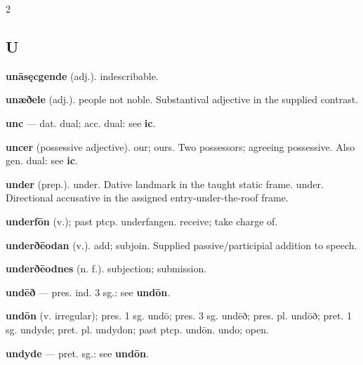 \begin{multicols*}{2}
\subsection*{U}
\textbf{unāsęcgende} (adj.). indescribable.\par
\textbf{unæðele} (adj.). people not noble. Substantival adjective in the supplied contrast.\par
\textbf{unc} — dat. dual; acc. dual: see \textbf{ic}.\par
\textbf{uncer} (possessive adjective). our; ours. Two possessors; agreeing possessive. Also gen. dual: see \textbf{ic}.\par
\textbf{under} (prep.). under. Dative landmark in the taught static frame. under. Directional accusative in the assigned entry-under-the-roof frame.\par
\textbf{underfōn} (v.); past ptcp. underfangen. receive; take charge of.\par
\textbf{underðēodan} (v.). add; subjoin. Supplied passive/participial addition to speech.\par
\textbf{underðēodnes} (n. f.). subjection; submission.\par
\textbf{undēð} — pres. ind. 3 sg.: see \textbf{undōn}.\par
\textbf{undōn} (v. irregular); pres. 1 sg. undō; pres. 3 sg. undēð; pres. pl. undōð; pret. 1 sg. undyde; pret. pl. undydon; past ptcp. undōn. undo; open.\par
\textbf{undyde} — pret. sg.: see \textbf{undōn}.\par

\end{multicols*}
